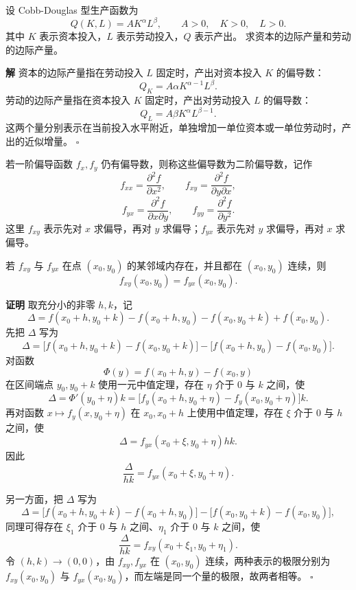 \documentclass[fontset=fandol]{ctexart}
\newenvironment{proofdetail}{\par\noindent\textbf{证明}\quad}{\hfill$\square$\par\vspace{0.8em}}
\newenvironment{solution}{\par\noindent\textbf{解}\quad}{\hfill$\square$\par\vspace{0.8em}}
\begin{document}
\begin{example}[边际产量]
设 Cobb-Douglas 型生产函数为
\[
Q(K,L)=A K^\alpha L^\beta,\qquad A>0,\quad K>0,\quad L>0.
\]
其中 $K$ 表示资本投入，$L$ 表示劳动投入，$Q$ 表示产出。 求资本的边际产量和劳动的边际产量。
\end{example}
\begin{solution}
资本的边际产量指在劳动投入 $L$ 固定时，产出对资本投入 $K$ 的偏导数：
\[
Q_K=A\alpha K^{\alpha-1}L^\beta.
\]
劳动的边际产量指在资本投入 $K$ 固定时，产出对劳动投入 $L$ 的偏导数：
\[
Q_L=A\beta K^\alpha L^{\beta-1}.
\]
这两个量分别表示在当前投入水平附近，单独增加一单位资本或一单位劳动时，产出的近似增量。
\end{solution}

\begin{definition}[二阶偏导数]
若一阶偏导函数 $f_x,f_y$ 仍有偏导数，则称这些偏导数为二阶偏导数，记作
\[
f_{xx}=\frac{\partial^2 f}{\partial x^2},\qquad
f_{xy}=\frac{\partial^2 f}{\partial y\partial x},
\]
\[
f_{yx}=\frac{\partial^2 f}{\partial x\partial y},\qquad
f_{yy}=\frac{\partial^2 f}{\partial y^2}.
\]
这里 $f_{xy}$ 表示先对 $x$ 求偏导，再对 $y$ 求偏导；$f_{yx}$ 表示先对 $y$ 求偏导，再对 $x$ 求偏导。
\end{definition}

\begin{theorem}[混合偏导相等的充分条件]
若 $f_{xy}$ 与 $f_{yx}$ 在点 $(x_0,y_0)$ 的某邻域内存在，并且都在 $(x_0,y_0)$ 连续，则
\[
f_{xy}(x_0,y_0)=f_{yx}(x_0,y_0).
\]
\end{theorem}
\begin{proofdetail}
取充分小的非零 $h,k$，记
\[
\Delta=f(x_0+h,y_0+k)-f(x_0+h,y_0)-f(x_0,y_0+k)+f(x_0,y_0).
\]
先把 $\Delta$ 写为
\[
\Delta=\bigl[f(x_0+h,y_0+k)-f(x_0,y_0+k)\bigr]
-\bigl[f(x_0+h,y_0)-f(x_0,y_0)\bigr].
\]
对函数
\[
\Phi(y)=f(x_0+h,y)-f(x_0,y)
\]
在区间端点 $y_0,y_0+k$ 使用一元中值定理，存在 $\eta$ 介于 $0$ 与 $k$ 之间，使
\[
\Delta=\Phi'(y_0+\eta)k
=\bigl[f_y(x_0+h,y_0+\eta)-f_y(x_0,y_0+\eta)\bigr]k.
\]
再对函数 $x\mapsto f_y(x,y_0+\eta)$ 在 $x_0,x_0+h$ 上使用中值定理，存在 $\xi$ 介于 $0$ 与 $h$ 之间，使
\[
\Delta=f_{yx}(x_0+\xi,y_0+\eta)hk.
\]
因此
\[
\frac{\Delta}{hk}=f_{yx}(x_0+\xi,y_0+\eta).
\]

另一方面，把 $\Delta$ 写为
\[
\Delta=\bigl[f(x_0+h,y_0+k)-f(x_0+h,y_0)\bigr]
-\bigl[f(x_0,y_0+k)-f(x_0,y_0)\bigr],
\]
同理可得存在 $\xi_1$ 介于 $0$ 与 $h$ 之间、$\eta_1$ 介于 $0$ 与 $k$ 之间，使
\[
\frac{\Delta}{hk}=f_{xy}(x_0+\xi_1,y_0+\eta_1).
\]
令 $(h,k)\to(0,0)$，由 $f_{xy},f_{yx}$ 在 $(x_0,y_0)$ 连续，两种表示的极限分别为 $f_{xy}(x_0,y_0)$ 与 $f_{yx}(x_0,y_0)$，而左端是同一个量的极限，故两者相等。
\end{proofdetail}
\end{document}
